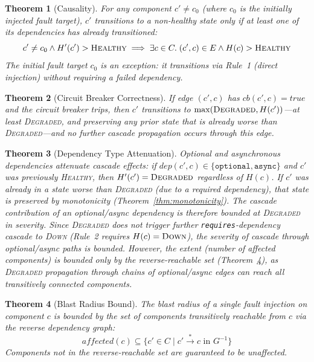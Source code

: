 \documentclass[10pt,twocolumn]{article}
\newtheorem{theorem}{Theorem}
\begin{document}
\begin{theorem}[Causality]\label{thm:causality}
For any component $c' \neq c_0$ (where $c_0$ is the initially
injected fault target), $c'$ transitions to a non-healthy state only
if at least one of its dependencies has already transitioned:
\begin{equation*}
  c' \neq c_0 \wedge H'(c') > \textsc{Healthy} \implies \exists c \in C.\;
  (c', c) \in E \wedge H(c) > \textsc{Healthy}
\end{equation*}
The initial fault target $c_0$ is an exception: it transitions via
Rule~1 (direct injection) without requiring a failed dependency.
\end{theorem}

\begin{theorem}[Circuit Breaker Correctness]\label{thm:cb}
If edge $(c', c)$ has $\mathit{cb}(c', c) = \mathit{true}$ and the
circuit breaker trips, then $c'$ transitions to
$\max(\textsc{Degraded}, H(c'))$---at least \textsc{Degraded},
and preserving any prior state that is already worse than
\textsc{Degraded}---and no further cascade propagation occurs
through this edge.
\end{theorem}

\begin{theorem}[Dependency Type Attenuation]\label{thm:attenuation}
Optional and asynchronous dependencies attenuate cascade effects:
if $\mathit{dep}(c', c) \in \{\texttt{optional}, \texttt{async}\}$
and $c'$ was previously \textsc{Healthy}, then
$H'(c') = \textsc{Degraded}$ regardless of $H(c)$. If $c'$ was
already in a state worse than \textsc{Degraded} (due to a required
dependency), that state is preserved by monotonicity
(Theorem~\ref{thm:monotonicity}). The cascade contribution of an
optional/async dependency is therefore bounded at \textsc{Degraded}
in \emph{severity}. Since \textsc{Degraded} does not trigger further
\texttt{requires}-dependency cascade to \textsc{Down}
(Rule~2 requires $H(c) = \textsc{Down}$), the
severity of cascade through optional/async paths is bounded.
However, the \emph{extent} (number of affected components) is bounded
only by the reverse-reachable set (Theorem~\ref{thm:blast}), as
\textsc{Degraded} propagation through chains of optional/async edges
can reach all transitively connected components.
\end{theorem}

\begin{theorem}[Blast Radius Bound]\label{thm:blast}
The blast radius of a single fault injection on component $c$ is
bounded by the set of components transitively reachable from $c$
via the reverse dependency graph:
\begin{equation*}
  \mathit{affected}(c) \subseteq \{c' \in C \mid c' \xrightarrow{*} c \text{ in } G^{-1}\}
\end{equation*}
Components not in the reverse-reachable set are guaranteed to be unaffected.
\end{theorem}
\end{document}

